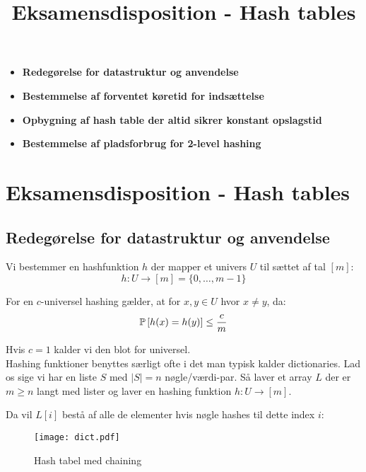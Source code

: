 
\title{Eksamensdisposition - Hash tables}


\maketitle

\begin{itemize}
  \item \textbf{Redegørelse for datastruktur og anvendelse}
  \item \textbf{Bestemmelse af forventet køretid for indsættelse}
  \item \textbf{Opbygning af hash table der altid sikrer konstant opslagstid}
  \item \textbf{Bestemmelse af pladsforbrug for 2-level hashing}
\end{itemize}


\newpage
\section{Eksamensdisposition - Hash tables}
\subsection{Redegørelse for datastruktur og anvendelse}
Vi bestemmer en hashfunktion $h$ der mapper et univers $U$ til sættet af tal $[m]$:
$$
  h : U \rightarrow [m] = \{0, \dots, m-1 \}
$$

For en $c$-universel hashing gælder, at for $x, y \in U$ hvor $x \neq y$, da:
$$
\P{h(x) = h(y)} \leq \frac{c}{m}
$$

Hvis $c = 1$ kalder vi den blot for universel.\\

Hashing funktioner benyttes særligt ofte i det man typisk kalder dictionaries. Lad os sige vi har en liste $S$ med $|S| = n$ nøgle/værdi-par. Så laver et array $L$ der er $m \geq n$ langt med lister og laver en hashing funktion $h : U \rightarrow [m]$.

Da vil $L[i]$ bestå af alle de elementer hvis nøgle hashes til dette index $i$:
\begin{figure}[H]
  \begin{center}
  \texttt{[image: dict.pdf]}
  \end{center}
  \caption{Hash tabel med chaining}
  \label{fig:hash}
\end{figure}

